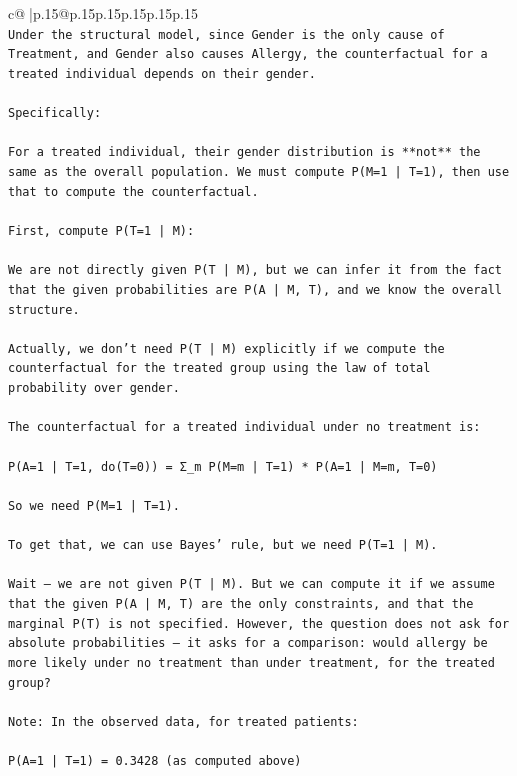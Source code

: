 \documentclass{article}
\begin{document}
{\begin{supertabular}{c@{$\;$}|p{.15\linewidth}@{}p{.15\linewidth}p{.15\linewidth}p{.15\linewidth}p{.15\linewidth}p{.15\linewidth}}
{{{\\ 
\texttt{Under the structural model, since Gender is the only cause of Treatment, and Gender also causes Allergy, the counterfactual for a treated individual depends on their gender.} \\
\\ 
\texttt{Specifically:} \\
\\ 
\texttt{For a treated individual, their gender distribution is **not** the same as the overall population. We must compute P(M=1 | T=1), then use that to compute the counterfactual.} \\
\\ 
\texttt{First, compute P(T=1 | M):} \\
\\ 
\texttt{We are not directly given P(T | M), but we can infer it from the fact that the given probabilities are P(A | M, T), and we know the overall structure.} \\
\\ 
\texttt{Actually, we don’t need P(T | M) explicitly if we compute the counterfactual for the treated group using the law of total probability over gender.} \\
\\ 
\texttt{The counterfactual for a treated individual under no treatment is:} \\
\\ 
\texttt{P(A=1 | T=1, do(T=0)) = Σ\_m P(M=m | T=1) * P(A=1 | M=m, T=0)} \\
\\ 
\texttt{So we need P(M=1 | T=1).} \\
\\ 
\texttt{To get that, we can use Bayes’ rule, but we need P(T=1 | M).} \\
\\ 
\texttt{Wait — we are not given P(T | M). But we can compute it if we assume that the given P(A | M, T) are the only constraints, and that the marginal P(T) is not specified. However, the question does not ask for absolute probabilities — it asks for a comparison: would allergy be more likely under no treatment than under treatment, for the treated group?} \\
\\ 
\texttt{Note: In the observed data, for treated patients:} \\
\\ 
\texttt{P(A=1 | T=1) = 0.3428 (as computed above)} \\
\\ 
}}}
\end{supertabular}}
\end{document}
